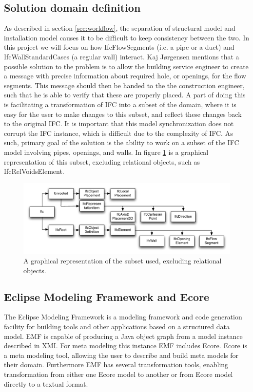 \subsection{Solution domain definition}
\label{sec:solution_domain_definition}
As described in section \ref{sec:workflow}, the separation of structural model and installation model causes it to be difficult to keep consistency between the two. In this project we will focus on how IfcFlowSegments (i.e. a pipe or a duct) and IfcWallStandardCases (a regular wall) interact. Kaj J\o rgensen mentions that a possible solution to the problem is to allow the building service engineer to create a message with precise information about required hole, or openings, for the flow segments. This message should then be handed to the the construction engineer, such that he is able to verify that these are properly placed. A part of doing this is facilitating a transformation of IFC into a subset of the domain, where it is easy for the user to make changes to this subset, and reflect these changes back to the original IFC. It is important that this model synchronization does not corrupt the IFC instance, which is difficult due to the complexity of IFC. As such, primary goal of the solution is the ability to work on a subset of the IFC model involving pipes, openings, and walls. In figure \ref{fig:ifcheirachy} is a graphical representation of this subset, excluding relational objects, such as IfcRelVoidsElement.

\begin{figure}[htbp]
    \centering
        \includegraphics[width=120mm]{images/IfcHeirachy.pdf}
    \caption{A graphical representation of the subset used, excluding relational objects.}
    \label{fig:ifcheirachy}
\end{figure}

\subsection{Eclipse Modeling Framework and Ecore}
The Eclipse Modeling Framework is a modeling framework and code generation facility for building tools and other applications based on a structured data model.\cite{emf} EMF is capable of producing a Java object graph from a model instance described in XMI. For meta modeling this instance EMF includes Ecore. Ecore is a meta modeling tool, allowing the user to describe and build meta models for their domain. Furthermore EMF has several transformation tools, enabling transformation from either one Ecore model to another or from Ecore model directly to a textual format.

